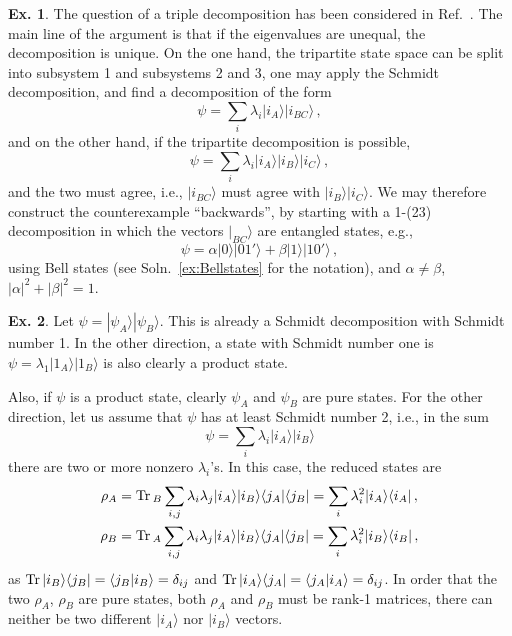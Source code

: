 \documentclass[a4paper,12pt]{article}
\def\Tr{\ensuremath{\mathop{\rm Tr}}{}}
\theoremstyle{definition}
\newtheorem{exercise}{Ex.}[section]
\begin{document}
\begin{exercise}
 The question of a triple decomposition has been considered in Ref.~\cite{PeresHigherOrderSchmidt}. The main line of the argument is that if the eigenvalues are unequal, the decomposition is unique. On the one hand, the tripartite state space can be split into subsystem 1 and subsystems 2 and 3, one may apply the Schmidt decomposition, and find a decomposition of the form
 \[
  \psi = \sum_i \lambda_i |i_A\rangle|i_{BC}\rangle\,,
 \]
 and on the other hand, if the tripartite decomposition is possible,
 \[
  \psi = \sum_i \lambda_i |i_A\rangle|i_B\rangle|i_C\rangle\,,
 \]
 and the two must agree, i.e., $|i_{BC}\rangle$ must agree with $|i_B\rangle |i_C\rangle$. We may therefore construct the counterexample ``backwards'', by starting with a 1-(23) decomposition in which the vectors $|_{BC}\rangle$ are entangled states, e.g.,
 \[
  \psi = \alpha |0\rangle |01'\rangle + \beta |1\rangle |10'\rangle\,,
 \]
 using Bell states (see Soln.~\ref{ex:Bellstates} for the notation), and $\alpha\ne\beta$, $|\alpha|^2+|\beta|^2=1$.
\end{exercise}

\begin{exercise}
 Let $\psi = |\psi_A\rangle|\psi_B\rangle$. This is already a Schmidt decomposition with Schmidt number 1. In the other direction, a state with Schmidt number one is
 $\psi = \lambda_1 |1_A\rangle |1_B\rangle$ is also clearly a product state.

 Also, if $\psi$ is a product state, clearly $\psi_A$ and $\psi_B$ are pure states. For the other direction, let us assume that $\psi$ has at least Schmidt number 2, i.e., in the sum
 \[
  \psi = \sum_i \lambda_i |i_A\rangle |i_B\rangle
 \]
 there are two or more nonzero $\lambda_i$'s. In this case, the reduced states are
 \[
  \begin{aligned}
   \rho_A &= \Tr_B \sum_{i,j} \lambda_i\lambda_j |i_A\rangle |i_B\rangle \langle j_A|\langle j_B| = \sum_i \lambda_i^2 |i_A\rangle \langle i_A|\,,\\
   \rho_B &= \Tr_A \sum_{i,j} \lambda_i\lambda_j |i_A\rangle |i_B\rangle \langle j_A|\langle j_B| = \sum_i \lambda_i^2 |i_B\rangle \langle i_B|\,,
  \end{aligned}
 \]
 as $\Tr |i_B\rangle\langle j_B| = \langle j_B|i_B\rangle = \delta_{ij}$ and $\Tr |i_A\rangle\langle j_A| = \langle j_A|i_A\rangle = \delta_{ij}$. In order that the two $\rho_A$, $\rho_B$ are pure states, both $\rho_A$ and $\rho_B$ must be rank-1 matrices, there can neither be two different $|i_A\rangle$ nor $|i_B\rangle$ vectors.
\end{exercise}
\end{document}

